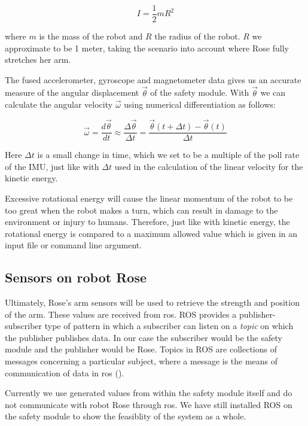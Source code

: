 \documentclass[12pt]{scrreprt}
\begin{document}
\begin{equation}
    I = \frac{1}{2}mR^2
\end{equation}

where $m$ is the mass of the robot and $R$ the radius of the robot. $R$ we approximate to be 1 meter, taking the scenario into account where Rose fully stretches her arm.
\par
The fused accelerometer, gyroscope and magnetometer data gives us an accurate measure of the angular displacement $\vec{\theta}$ of the safety module. With $\vec{\theta}$ we can calculate the angular velocity $\vec{\omega}$ using numerical differentiation as follows:

\begin{equation}
    \vec{\omega} = \frac{d\vec{\theta}}{dt} \approx \frac{\Delta\vec{\theta}}{\Delta t} = \frac{\vec{\theta}(t + \Delta t ) - \vec{\theta}(t)}{\Delta t}
\end{equation}

Here $\Delta t$ is a small change in time, which we set to be a multiple of the poll rate of the IMU, just like with $\Delta t$ used in the calculation of the linear velocity for the kinetic energy.
\par
Excessive rotational energy will cause the linear momentum of the robot to be too great when the robot makes a turn, which can result in damage to the environment or injury to humans. Therefore, just like with kinetic energy, the rotational energy is compared to a maximum allowed value which is given in an input file or command line argument.

\subsection{Sensors on robot Rose}
Ultimately, Rose's arm sensors will be used to retrieve the strength and position of the arm. These values are received from \acrshort{ros}. ROS provides a publisher-subscriber type of pattern in which a subscriber can listen on a \textit{topic} on which the publisher publishes data. In our case the subscriber would be the safety module and the publisher would be Rose. Topics in ROS are collections of messages concerning a particular subject, where a message is the means of communication of data in \acrshort{ros} (\cite{agitr}).
\par
Currently we use generated values from within the safety module itself and do not communicate with robot Rose through \acrshort{ros}. We have still installed ROS on the safety module to show the feasiblity of the system as a whole. 
\end{document}
